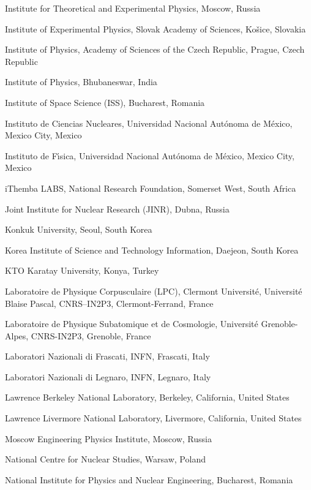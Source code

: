 \begin{flushleft}
\begin{Authlist}
\item {}Institute for Theoretical and Experimental Physics, Moscow, Russia
\item {}Institute of Experimental Physics, Slovak Academy of Sciences, Ko\v{s}ice, Slovakia
\item {}Institute of Physics, Academy of Sciences of the Czech Republic, Prague, Czech Republic
\item {}Institute of Physics, Bhubaneswar, India
\item {}Institute of Space Science (ISS), Bucharest, Romania
\item {}Instituto de Ciencias Nucleares, Universidad Nacional Aut\'{o}noma de M\'{e}xico, Mexico City, Mexico
\item {}Instituto de F\'{\i}sica, Universidad Nacional Aut\'{o}noma de M\'{e}xico, Mexico City, Mexico
\item {}iThemba LABS, National Research Foundation, Somerset West, South Africa
\item {}Joint Institute for Nuclear Research (JINR), Dubna, Russia
\item {}Konkuk University, Seoul, South Korea
\item {}Korea Institute of Science and Technology Information, Daejeon, South Korea
\item {}KTO Karatay University, Konya, Turkey
\item {}Laboratoire de Physique Corpusculaire (LPC), Clermont Universit\'{e}, Universit\'{e} Blaise Pascal, CNRS--IN2P3, Clermont-Ferrand, France
\item {}Laboratoire de Physique Subatomique et de Cosmologie, Universit\'{e} Grenoble-Alpes, CNRS-IN2P3, Grenoble, France
\item {}Laboratori Nazionali di Frascati, INFN, Frascati, Italy
\item {}Laboratori Nazionali di Legnaro, INFN, Legnaro, Italy
\item {}Lawrence Berkeley National Laboratory, Berkeley, California, United States
\item {}Lawrence Livermore National Laboratory, Livermore, California, United States
\item {}Moscow Engineering Physics Institute, Moscow, Russia
\item {}National Centre for Nuclear Studies, Warsaw, Poland
\item {}National Institute for Physics and Nuclear Engineering, Bucharest, Romania

\end{Authlist}
\end{flushleft}
